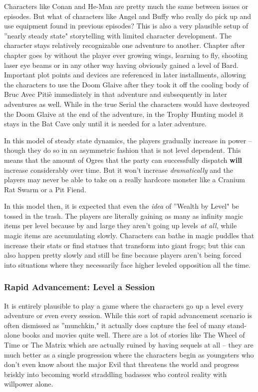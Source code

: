 Characters like Conan and He-Man are pretty much the same between issues or episodes. But what of characters like Angel and Buffy who really do pick up and use equipment found in previous episodes? This is also a very plausible setup of ''nearly steady state" storytelling with limited character development. The character stays relatively recognizable one adventure to another. Chapter after chapter goes by without the player ever growing wings, learning to fly, shooting laser eye beams or in any other way having obviously gained a level of Bard. Important plot points and devices are referenced in later installments, allowing the characters to use the Doom Glaive after they took it off the cooling body of Bruc Avec Piti\`{e} immediately in that adventure and subsequently in later adventures as well. While in the true Serial the characters would have destroyed the Doom Glaive at the end of the adventure, in the Trophy Hunting model it stays in the Bat Cave only until it is needed for a later adventure.

In this model of steady state dynamics, the players gradually increase in power -- though they do so in an asymmetric fashion that is not level dependent. This means that the amount of Ogres that the party can successfully dispatch \textbf{will} increase considerably over time. But it won't increase \textit{dramatically} and the players may never be able to take on a really hardcore monster like a Cranium Rat Swarm or a Pit Fiend.

In this model then, it is expected that even the \textit{idea} of ''Wealth by Level" be tossed in the trash. The players are literally gaining as many as infinity magic items per level because by and large they aren't going up levels \textit{at all}, while magic items are accumulating slowly. Characters can bathe in magic puddles that increase their stats or find statues that transform into giant frogs; but this can also happen pretty slowly and still be fine because players aren't being forced into situations where they necessarily face higher leveled opposition all the time.

\subsubsection{Rapid Advancement: Level a Session}
\vspace*{-8pt}

It is entirely plausible to play a game where the characters go up a level every adventure or even every session. While this sort of rapid advancement scenario is often dismissed as ''munchkin," it actually does capture the feel of many stand-alone books and movies quite well. There are a lot of stories like The Wheel of Time or The Matrix which are actually ruined by having sequels at all -- they are much better as a single progression where the characters begin as youngsters who don't even know about the major Evil that threatens the world and progress briskly into becoming world straddling badasses who control reality with willpower alone.

